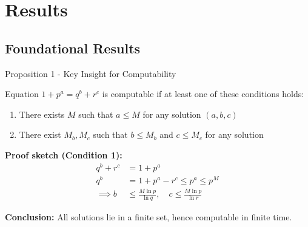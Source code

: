 \section{Results}

\subsection{Foundational Results}

\begin{frame}{Proposition 1 - Key Insight for Computability}
    \begin{proposition}
       Equation $1+p^a = q^b + r^c$ is computable if at least one of these conditions holds:
       \begin{enumerate}
           \item There exists $M$ such that $a \leq M$ for any solution $(a,b,c)$
           \item There exist $M_b, M_c$ such that $b \leq M_b$ and $c \leq M_c$ for any solution
       \end{enumerate}
    \end{proposition}

    \textbf{Proof sketch (Condition 1):}
    \begin{align*}
        q^b+r^c &= 1+p^a \\
        q^b &= 1+p^a - r^c \leq p^a \leq p^M \\
        \implies b &\leq \frac{M\ln p}{\ln q},\quad c \leq \frac{M\ln p}{\ln r}
    \end{align*}

    \textbf{Conclusion:} All solutions lie in a finite set, hence computable in finite time.
\end{frame}

